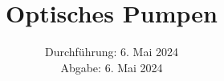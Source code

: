 

\subject{\texorpdfstring{\vspace{2ex}}{}V21\texorpdfstring{\vspace{-2ex}}{}} %
\title{Optisches Pumpen} %
\date{
	Durchführung: 6. Mai 2024 %
	\\ Abgabe: 6. Mai 2024 %
}




\maketitle
\thispagestyle{empty}


\tableofcontents
\newpage








\printbibliography{}

\newpage



